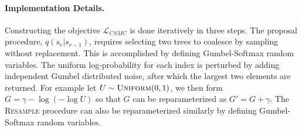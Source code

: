 \documentclass[accepted]{uai2021} %
\theoremstyle{definition}
\begin{document}
\paragraph{Implementation Details.}
Constructing the objective $\mathcal{L}_{CSMC}$ is done iteratively in three steps. The proposal procedure, $q(s_r|s_{r-1})$, requires selecting two trees to coalesce by sampling without replacement. This is accomplished by defining Gumbel-Softmax random variables. The uniform log-probability for each index is perturbed by adding independent Gumbel distributed noise, after which the largest two elements are returned. For example let $U\sim \textsc{Uniform}(0,1)$, we then form $G = \gamma - \log(- \log U)$ so that $G$ can be reparameterized as $G' = G + \gamma$. The \textsc{Resample} procedure %
can also be reparameterized similarly by defining Gumbel-Softmax random variables. 
\end{document}
